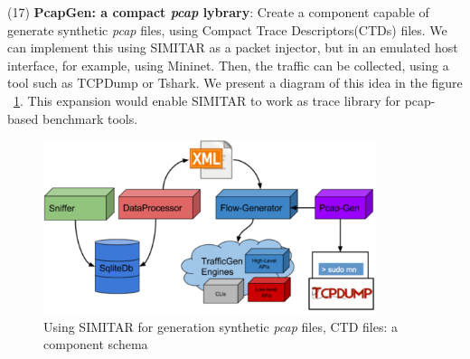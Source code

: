 (17) \textbf{PcapGen: a compact \textit{pcap} lybrary}: Create a component capable of generate synthetic \textit{pcap} files, using Compact Trace Descriptors(CTDs) files. We can implement this using SIMITAR as a packet injector, but in an emulated host interface, for example, using Mininet. Then, the traffic can be collected, using a tool such as TCPDump or Tshark. We present a diagram of this idea in the figure ~\ref{fig:pcap-gen}. This expansion would enable SIMITAR  to work as trace library for pcap-based benchmark tools.


\begin{figure}[!ht]
    \centering
    \includegraphics[height=2.0in]{figures/ch6/pcap-gen}
    \caption{Using SIMITAR for generation synthetic \textit{pcap} files, CTD files: a component schema}
    \label{fig:pcap-gen}
\end{figure}
    






